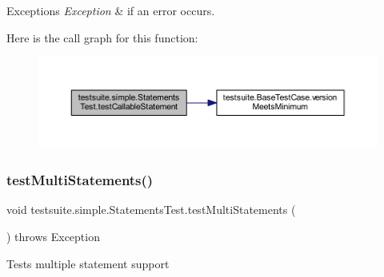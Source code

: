 \begin{DoxyExceptions}{Exceptions}
{\em Exception} & if an error occurs. \\
\hline
\end{DoxyExceptions}
Here is the call graph for this function\+:
\nopagebreak
\begin{figure}[H]
\begin{center}
\leavevmode
\includegraphics[width=350pt]{classtestsuite_1_1simple_1_1_statements_test_a575857630ae7ba0e8a97025a9d5d772f_cgraph}
\end{center}
\end{figure}
\mbox{\label{classtestsuite_1_1simple_1_1_statements_test_a8be371b068b81e39350ba4e2b1287800}} 
\subsubsection{\texorpdfstring{test\+Multi\+Statements()}{testMultiStatements()}}
{\footnotesize\ttfamily void testsuite.\+simple.\+Statements\+Test.\+test\+Multi\+Statements (\begin{DoxyParamCaption}{ }\end{DoxyParamCaption}) throws Exception}

Tests multiple statement support


